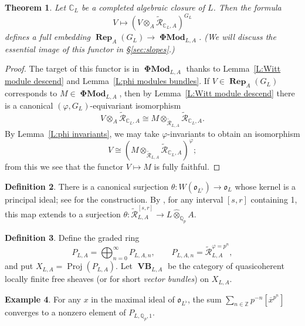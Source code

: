 \documentclass[12pt]{amsart}
\newtheorem{theorem}{Theorem}[section]
\theoremstyle{definition}
\newtheorem{defn}[theorem]{Definition}
\newtheorem{example}[theorem]{Example}
\numberwithin{equation}{theorem}
\newcommand{\CC}{\mathbb{C}}
\newcommand{\QQ}{\mathbb{Q}}
\newcommand{\ZZ}{\mathbb{Z}}
\newcommand{\calR}{\mathcal{R}}
\newcommand{\frako}{\mathfrak{o}}
\DeclareMathOperator{\PhiMod}{\mathbf{\Phi Mod}}
\DeclareMathOperator{\Proj}{Proj}
\DeclareMathOperator{\Rep}{\mathbf{Rep}}
\DeclareMathOperator{\VB}{\mathbf{VB}}
\begin{document}
\begin{theorem} \label{T:perfect embedding}
Let $\CC_L$ be a completed algebraic closure of $L$. Then the formula 
\[
V \mapsto (V \otimes_A \tilde{\calR}_{\CC_L, A})^{G_L}
\]
defines a full embedding $\Rep_A(G_L) \to \PhiMod_{L,A}$.
(We will discuss the essential image of this functor in \S\ref{sec:slopes}.)
\end{theorem}
\begin{proof}
The target of this functor is in $\PhiMod_{L,A}$ thanks to 
Lemma~\ref{L:Witt module descend} and Lemma~\ref{L:phi modules bundles}.
If $V \in \Rep_A(G_L)$ corresponds to $M \in \PhiMod_{L,A}$, 
then by Lemma~\ref{L:Witt module descend} there is a canonical $(\varphi, G_L)$-equivariant isomorphism
\[
V \otimes_A \tilde{\calR}_{\CC_L, A} \cong M \otimes_{\tilde{\calR}_{L,A}} \tilde{\calR}_{\CC_L,A}.
\]
By Lemma~\ref{L:phi invariants}, we may take $\varphi$-invariants to obtain an isomorphism
\[
V \cong (M \otimes_{\tilde{\calR}_{L,A}} \tilde{\calR}_{\CC_L,A})^{\varphi};
\]
from this we see that the functor $V \mapsto M$ is fully faithful.
\end{proof}

\begin{defn}
There is a canonical surjection $\theta: W(\frako_{L^\flat}) \to \frako_L$ whose kernel is a principal ideal; see
\cite[\S 1]{kedlaya-new-phigamma} for the construction.
By \cite[Lemma~5.5.5]{kedlaya-liu1}, for any interval $[s,r]$ containing 1,
this map extends to a surjection
$\theta: \tilde{\calR}^{[s,r]}_{L,A} \to L \widehat{\otimes}_{\QQ_p} A$.
\end{defn}

\begin{defn}
Define the graded ring
\[
P_{L,A} = \bigoplus_{n=0}^\infty P_{L,A,n}, \qquad P_{L,A,n} = \tilde{\calR}_{L,A}^{\varphi=p^n},
\]
and put $X_{L,A} = \Proj(P_{L,A})$.
Let $\VB_{L,A}$ be the category of quasicoherent locally finite free sheaves (or for short \emph{vector bundles}) on $X_{L,A}$.
\end{defn}

\begin{example}
For any $x$ in the maximal ideal of $\frako_{L^{\flat}}$, the sum $\sum_{n \in \ZZ} p^{-n} [\overline{x}^{p^n}]$
converges to a nonzero element of $P_{L,\QQ_p,1}$.
\end{example}
\end{document}
